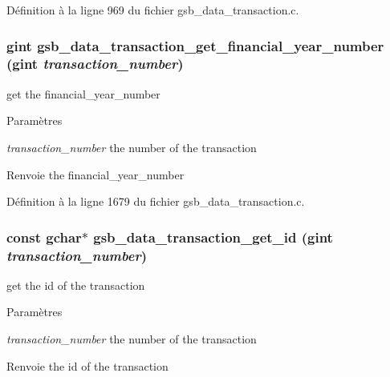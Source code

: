 Définition à la ligne 969 du fichier gsb\_\-data\_\-transaction.c.

\subsubsection[{gsb\_\-data\_\-transaction\_\-get\_\-financial\_\-year\_\-number}]{\setlength{\rightskip}{0pt plus 5cm}gint gsb\_\-data\_\-transaction\_\-get\_\-financial\_\-year\_\-number (gint {\em transaction\_\-number})}\label{gsb__data__transaction_8h_ae8f3e659e304f02abd6c2ae7dd759203}
get the financial\_\-year\_\-number 
\begin{DoxyParams}{Paramètres}
\item[{\em transaction\_\-number}]the number of the transaction \end{DoxyParams}
\begin{DoxyReturn}{Renvoie}
the financial\_\-year\_\-number 
\end{DoxyReturn}


Définition à la ligne 1679 du fichier gsb\_\-data\_\-transaction.c.

\subsubsection[{gsb\_\-data\_\-transaction\_\-get\_\-id}]{\setlength{\rightskip}{0pt plus 5cm}const gchar$\ast$ gsb\_\-data\_\-transaction\_\-get\_\-id (gint {\em transaction\_\-number})}\label{gsb__data__transaction_8h_a14a1730f01690f24ee0b884cb9654e72}
get the id of the transaction


\begin{DoxyParams}{Paramètres}
\item[{\em transaction\_\-number}]the number of the transaction\end{DoxyParams}
\begin{DoxyReturn}{Renvoie}
the id of the transaction 
\end{DoxyReturn}


